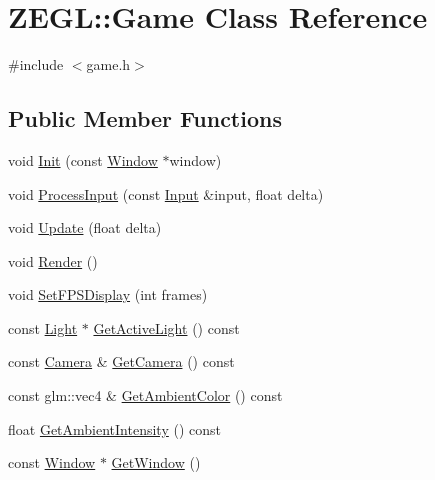 \hypertarget{class_z_e_g_l_1_1_game}{}\section{Z\+E\+G\+L\+:\+:Game Class Reference}
\label{class_z_e_g_l_1_1_game}


{\ttfamily \#include $<$game.\+h$>$}

\subsection*{Public Member Functions}
\begin{DoxyCompactItemize}
\item 
void \hyperlink{class_z_e_g_l_1_1_game_a08afc15e9896fef7f294f90d736d24cd}{Init} (const \hyperlink{class_z_e_g_l_1_1_window}{Window} $\ast$window)
\item 
void \hyperlink{class_z_e_g_l_1_1_game_ab64891eae2c4eb4f3bf7d161c6d5e37a}{Process\+Input} (const \hyperlink{class_z_e_g_l_1_1_input}{Input} \&input, float delta)
\item 
void \hyperlink{class_z_e_g_l_1_1_game_a6ad207394e4ce91f909d49c87802da08}{Update} (float delta)
\item 
void \hyperlink{class_z_e_g_l_1_1_game_a0897730fc9fed789f6c0f11d21a0c14a}{Render} ()
\item 
void \hyperlink{class_z_e_g_l_1_1_game_a38773e42c90201c4d8ca079ce54c4402}{Set\+F\+P\+S\+Display} (int frames)
\item 
const \hyperlink{class_z_e_g_l_1_1_light}{Light} $\ast$ \hyperlink{class_z_e_g_l_1_1_game_a82f5be49774c3ad1a96daac71eb0ddec}{Get\+Active\+Light} () const 
\item 
const \hyperlink{class_z_e_g_l_1_1_camera}{Camera} \& \hyperlink{class_z_e_g_l_1_1_game_a65c6ec575fef37dd386fa0534f6cad86}{Get\+Camera} () const 
\item 
const glm\+::vec4 \& \hyperlink{class_z_e_g_l_1_1_game_a82963ff86de3c1a1969f32de12c3863e}{Get\+Ambient\+Color} () const 
\item 
float \hyperlink{class_z_e_g_l_1_1_game_adb8a60aa109a04a92c3aee2065f79702}{Get\+Ambient\+Intensity} () const 
\item 
const \hyperlink{class_z_e_g_l_1_1_window}{Window} $\ast$ \hyperlink{class_z_e_g_l_1_1_game_a12474b22720b2559db897cd83b7dffce}{Get\+Window} ()
\end{DoxyCompactItemize}
